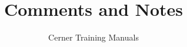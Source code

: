 

\title{Comments and Notes} %
\author{Cerner Training Manuals}



    \frontmatter
        \maketitle %
        \tableofcontents

    \mainmatter
        
    \backmatter


